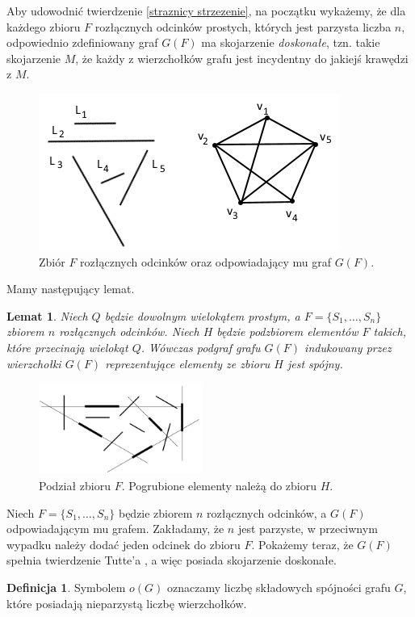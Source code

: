 \documentclass[brudnopis]{xmgr}
\newtheorem{Lemat}{Lemat}
\theoremstyle{definition}
\newtheorem{Definicja}{Definicja}
\begin{document}
Aby udowodnić twierdzenie \ref{straznicy strzezenie}, na początku wykażemy, że dla każdego zbioru $F$ rozłącznych odcinków prostych, których jest parzysta liczba $n$, odpowiednio zdefiniowany graf $G(F)$ ma skojarzenie \emph{doskonałe}, tzn. takie skojarzenie $M$, że każdy z wierzchołków grafu jest incydentny do jakiejś krawędzi z $M$.

\begin{figure}[ht!]
 \centering
  \includegraphics{rysunki/g_f.png}
  \caption{Zbiór $F$ rozłącznych odcinków oraz odpowiadający mu graf $G(F)$.}
  \label{fig:zbior odcinkow rozlacznych}
\end{figure} 

Mamy następujący lemat.
\begin{Lemat}\label{podgraf indukowany} \cite{illumination}
Niech $Q$ będzie dowolnym wielokątem prostym, a $F = \{S_1,\ldots,S_n\}$ zbiorem $n$ rozłącznych odcinków. Niech $H$ będzie podzbiorem elementów $F$ takich, które przecinają wielokąt $Q$. Wówczas podgraf grafu $G(F)$ indukowany przez wierzchołki $G(F)$ reprezentujące elementy ze zbioru $H$ jest spójny.
\end{Lemat}
\begin{figure}[ht!]
 \centering
  \includegraphics[height=3cm]{rysunki/podzial_h.png}
  \caption{Podział zbioru $F$. Pogrubione elementy należą do zbioru $H$.}
\end{figure} 
Niech $F = \{S_1,\ldots,S_n\}$ będzie zbiorem $n$ rozłącznych odcinków, a $G(F)$ odpowiadającym mu grafem. Zakładamy, że $n$ jest parzyste, w przeciwnym wypadku należy dodać jeden odcinek do zbioru $F$. Pokażemy teraz, że $G(F)$ spełnia twierdzenie Tutte'a \cite{tutte}, a więc posiada skojarzenie doskonałe.
\begin{Definicja}
	Symbolem $o(G)$ oznaczamy liczbę składowych spójności grafu $G$, które posiadają nieparzystą liczbę wierzchołków.
\end{Definicja}
\end{document}
